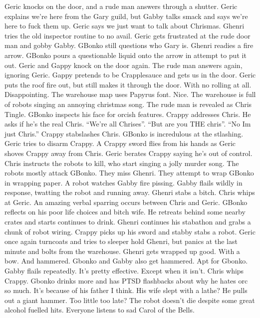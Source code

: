 Geric knocks on the door, and a rude man answers through a shutter.\medskip
Geric explains we’re here from the Gary guild, but Gabby talks smack and says we’re here to fuck them up.\medskip
Geric says we just want to talk about Chrismas.\medskip
Ghenri tries the old inspector routine to no avail.\medskip
Geric gets frustrated at the rude door man and gobby Gabby. GBonko still questions who Gary is.\medskip
Ghenri readies a fire arrow. GBonko pours a questionable liquid onto the arrow in attempt to put it out.\medskip
Geric and Gappy knock on the door again. The rude man answers again, ignoring Geric.\medskip
Gappy pretends to be Crapplesauce and gets us in the door.\medskip
Geric puts the roof fire out, but still makes it through the door. With no rolling at all. Disappointing.\medskip
The warehouse map uses Papyrus font. Nice.\medskip
The warehouse is full of robots singing an annoying christmas song.\medskip
The rude man is revealed as Chris Tingle. GBonko inspects his face for orcish features.\medskip
Crappy addresses Chris. He asks if he’s the real Chris. “We’re all Chrises”. “But are you THE chris”. “No Im just Chris.” Crappy stabslashes Chris. GBonko is incredulous at the stlashing. Geric tries to disarm Crappy. A Crappy sword flies from his hands as Geric shoves Crappy away from Chris.\medskip
Geric berates Crappy saying he’s out of control.\medskip
Chris instructs the robots to kill, who start singing a jolly murder song.\medskip
The robots mostly attack GBonko. They miss Ghenri. They attempt to wrap GBonko in wrapping paper. A robot watches Gabby fire pissing. Gabby flails wildly in response, twatting the robot and running away.\medskip
Ghenri stabs a bitch.\medskip
Chris whips at Geric. An amazing verbal sparring occurs between Chris and Geric.\medskip
GBonko reflects on his poor life choices and bitch wife. He retreats behind some nearby crates and starts continues to drink.\medskip
Ghenri continues his stabathon and grabs a chunk of robot wiring.\medskip
Crappy picks up his sword and stabby stabs a robot.\medskip
Geric once again turncoats and tries to sleeper hold Ghenri, but panics at the last minute and bolts from the warehouse.\medskip
Ghenri gets wrapped up good. With a bow. And hammered.\medskip
Gbonko and Gabby also get hammered. Apt for Gbonko.\medskip
Gabby flails repeatedly. It’s pretty effective. Except when it isn’t.\medskip
Chris whips Crappy.\medskip
Gbonko drinks more and has PTSD flashbacks about why he hates orc so much. It’s because of his father I think. His wife slept with a lathe? He pulls out a giant hammer. Too little too late? The robot doesn’t die despite some great alcohol fuelled hits. Everyone listens to sad Carol of the Bells.\medskip
